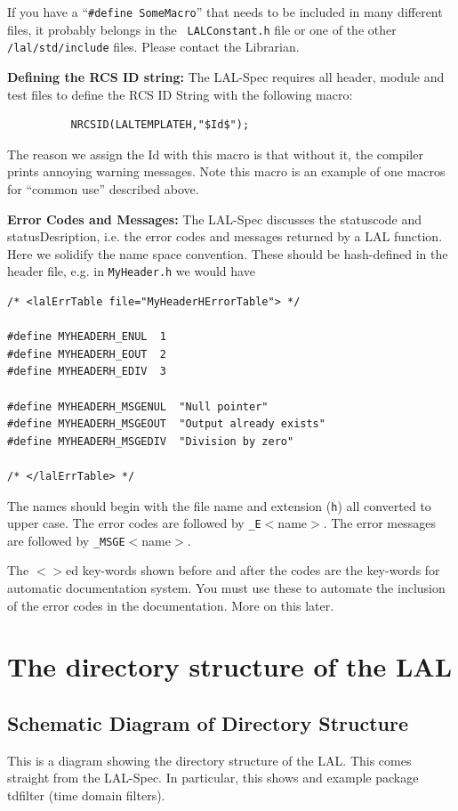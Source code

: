 \documentclass[oneside]{book}
\begin{document}
If you have a ``{\texttt {\#define SomeMacro}}'' that needs to be
included in many different files, it probably belongs in the {\tt
LALConstant.h} file or one of the other {\tt /lal/std/include} files.
Please contact the Librarian.

\bigskip

{\noindent \bf Defining the RCS ID string:}  The LAL-Spec 
requires all header, module and test files to define the
RCS ID String with the following macro: 
\begin{verbatim}
          NRCSID(LALTEMPLATEH,"$Id$");
\end{verbatim}
\noindent The reason we assign the Id with this macro is that without it,
the compiler prints annoying warning messages. Note this macro is an
example of one macros for ``common use'' described above.

\bigskip

{\noindent \bf Error Codes and Messages:} The LAL-Spec discusses the
statuscode and statusDesription, i.e. the error codes and  messages
returned by a LAL function. Here we solidify the name space
convention. These should be hash-defined in the header file, e.g. in
{\tt MyHeader.h} we would have
\begin{verbatim}
/* <lalErrTable file="MyHeaderHErrorTable"> */

#define MYHEADERH_ENUL  1 
#define MYHEADERH_EOUT  2
#define MYHEADERH_EDIV  3

#define MYHEADERH_MSGENUL  "Null pointer"
#define MYHEADERH_MSGEOUT  "Output already exists"
#define MYHEADERH_MSGEDIV  "Division by zero"

/* </lalErrTable> */
\end{verbatim}
\noindent The names should begin with the file name and extension ({\tt h})
all converted to upper case. The error codes are followed by
{\tt \_E}$<$name$>$. The error messages are followed by
{\tt \_MSGE}$<$name$>$.

The $<>$ed key-words shown before and after the codes are the
key-words for automatic documentation system.  You must use these to
automate the inclusion of the error codes in the documentation.  More
on this later.

\chapter{The directory structure of the LAL}
\label{c:DirectoryStructure}

\newpage
\section{Schematic Diagram of Directory Structure}
This is a diagram showing the   directory structure of the LAL.
This comes straight from the LAL-Spec. In particular, this shows
and example package tdfilter  (time domain filters).
\end{document}

